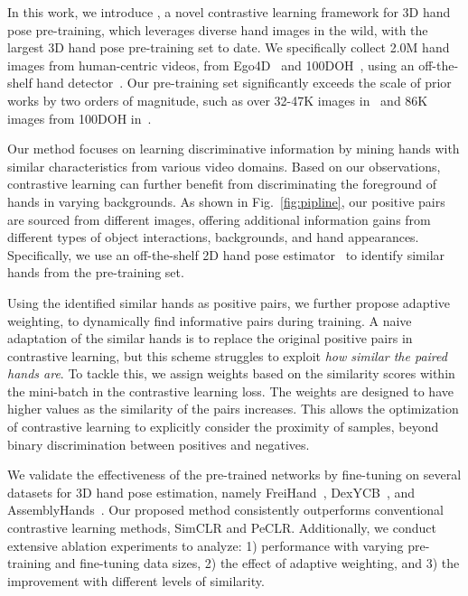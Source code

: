 In this work, we introduce \Ours, a novel contrastive learning framework for 3D hand pose pre-training, which leverages diverse hand images in the wild, with the largest 3D hand pose pre-training set to date. 
We specifically collect 2.0M hand images from human-centric videos, from Ego4D~\citep{grauman:cvpr22} and 100DOH~\citep{shan:cvpr20}, using an off-the-shelf hand detector~\citep{shan:cvpr20}. 
Our pre-training set significantly exceeds the scale of prior works by two orders of magnitude, such as over 32-47K images in~\citep{spurr:iccv21} and 86K images from 100DOH in~\citep{ziani:3dv22}.

Our method focuses on learning discriminative information by 
mining hands with similar characteristics from various video domains.
Based on our observations, contrastive learning can further benefit from discriminating the foreground of hands in varying backgrounds.
As shown in Fig.~\ref{fig:pipline}, our positive pairs are sourced from different images, offering additional information gains from different types of object interactions, backgrounds, and hand appearances. Specifically, we use an off-the-shelf 2D hand pose estimator~\citep{lugaresi:arxiv19} to identify similar hands from the pre-training set.

Using the identified similar hands as positive pairs, we further propose adaptive weighting, to dynamically find informative pairs during training.
A naive adaptation of the similar hands is to replace the original positive pairs in contrastive learning, but this scheme struggles to exploit \textit{how similar the paired hands are}.
To tackle this, we assign weights based on the similarity scores within the mini-batch in the contrastive learning loss.
The weights are designed to have higher values as the similarity of the pairs increases.
This allows the optimization of contrastive learning to explicitly consider the proximity of samples, beyond binary discrimination between positives and negatives.

We validate the effectiveness of the pre-trained networks by fine-tuning on several datasets for 3D hand pose estimation, namely FreiHand~\citep{zimmermann:iccv19}, DexYCB~\citep{chao:cvpr21}, and AssemblyHands~\citep{ohkawa:cvpr23}.
Our proposed method consistently outperforms conventional contrastive learning methods, SimCLR and PeCLR.
Additionally, we conduct extensive ablation experiments to analyze: 1) performance with varying pre-training and fine-tuning data sizes, 2) the effect of adaptive weighting, and 3) the improvement with different levels of similarity.

